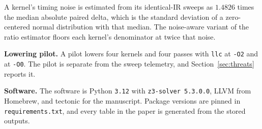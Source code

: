 A kernel's timing noise is estimated from its identical-IR sweeps as $1.4826$ times the median absolute paired delta, which is
the standard deviation of a zero-centered normal distribution with that median. The noise-aware variant of the ratio estimator
floors each kernel's denominator at twice that noise.

\textbf{Lowering pilot.} A pilot lowers four kernels and four passes with \texttt{llc} at
\texttt{-O2} and at \texttt{-O0}. The pilot is separate
from the sweep telemetry, and Section~\ref{sec:threats} reports it.

\textbf{Software.} The software is Python \texttt{3.\allowbreak{}12} with \texttt{z3-solver 5.\allowbreak{}3.\allowbreak{}0.\allowbreak{}0}, LLVM \LLVMVersion{} from Homebrew, and
tectonic for the manuscript. Package versions
are pinned in \texttt{requirements.\allowbreak{}txt}, and every table in the paper is generated from the stored outputs.
